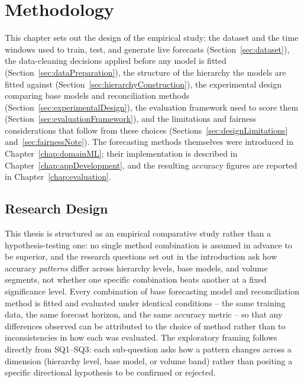 %
%
%

\chapter{Methodology}
\label{chap:methodology}

This chapter sets out the design of the empirical study: the dataset and the time windows used to train, test, and generate live forecasts (Section~\ref{sec:dataset}), the data-cleaning decisions applied before any model is fitted (Section~\ref{sec:dataPreparation}), the structure of the hierarchy the models are fitted against (Section~\ref{sec:hierarchyConstruction}), the experimental design comparing base models and reconciliation methods (Section~\ref{sec:experimentalDesign}), the evaluation framework used to score them (Section~\ref{sec:evaluationFramework}), and the limitations and fairness considerations that follow from these choices (Sections~\ref{sec:designLimitations} and~\ref{sec:fairnessNote}). The forecasting methods themselves were introduced in Chapter~\ref{chap:domainML}; their implementation is described in Chapter~\ref{chap:appDevelopment}, and the resulting accuracy figures are reported in Chapter~\ref{chap:evaluation}.

\section{Research Design}
\label{sec:researchDesign}

This thesis is structured as an empirical comparative study rather than a hypothesis-testing one: no single method combination is assumed in advance to be superior, and the research questions set out in the introduction ask how accuracy \emph{patterns} differ across hierarchy levels, base models, and volume segments, not whether one specific combination beats another at a fixed significance level. Every combination of base forecasting model and reconciliation method is fitted and evaluated under identical conditions -- the same training data, the same forecast horizon, and the same accuracy metric -- so that any differences observed can be attributed to the choice of method rather than to inconsistencies in how each was evaluated. The exploratory framing follows directly from SQ1--SQ3: each sub-question asks how a pattern changes across a dimension (hierarchy level, base model, or volume band) rather than positing a specific directional hypothesis to be confirmed or rejected.

